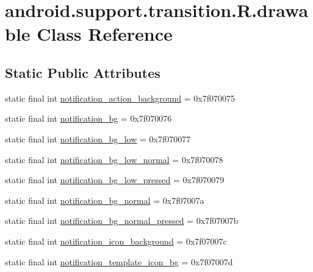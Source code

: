 \hypertarget{classandroid_1_1support_1_1transition_1_1_r_1_1drawable}{}\section{android.\+support.\+transition.\+R.\+drawable Class Reference}
\label{classandroid_1_1support_1_1transition_1_1_r_1_1drawable}
\subsection*{Static Public Attributes}
\begin{DoxyCompactItemize}
\item 
static final int \mbox{\hyperlink{classandroid_1_1support_1_1transition_1_1_r_1_1drawable_aa63a282bba48259acff502a4c32c48dd}{notification\+\_\+action\+\_\+background}} = 0x7f070075
\item 
static final int \mbox{\hyperlink{classandroid_1_1support_1_1transition_1_1_r_1_1drawable_a4e2d76cf7e408949c2b4a0776c7d683e}{notification\+\_\+bg}} = 0x7f070076
\item 
static final int \mbox{\hyperlink{classandroid_1_1support_1_1transition_1_1_r_1_1drawable_a80e92867febdd3ad8ce052e040508e3c}{notification\+\_\+bg\+\_\+low}} = 0x7f070077
\item 
static final int \mbox{\hyperlink{classandroid_1_1support_1_1transition_1_1_r_1_1drawable_a9fa9887b0c07972b38d4759215a9514c}{notification\+\_\+bg\+\_\+low\+\_\+normal}} = 0x7f070078
\item 
static final int \mbox{\hyperlink{classandroid_1_1support_1_1transition_1_1_r_1_1drawable_a5fe6e84c8b7aaf6841d0d37d1fba6dbb}{notification\+\_\+bg\+\_\+low\+\_\+pressed}} = 0x7f070079
\item 
static final int \mbox{\hyperlink{classandroid_1_1support_1_1transition_1_1_r_1_1drawable_a5331c92aadadaaf082aadfe262fcfaf8}{notification\+\_\+bg\+\_\+normal}} = 0x7f07007a
\item 
static final int \mbox{\hyperlink{classandroid_1_1support_1_1transition_1_1_r_1_1drawable_a267ef5dc70197b1688c3a36f7d3a514d}{notification\+\_\+bg\+\_\+normal\+\_\+pressed}} = 0x7f07007b
\item 
static final int \mbox{\hyperlink{classandroid_1_1support_1_1transition_1_1_r_1_1drawable_ab61974a44b1c6b8eafba4027955dac77}{notification\+\_\+icon\+\_\+background}} = 0x7f07007c
\item 
static final int \mbox{\hyperlink{classandroid_1_1support_1_1transition_1_1_r_1_1drawable_a0a2b6625f2aae8b0f520911b4dfe0c42}{notification\+\_\+template\+\_\+icon\+\_\+bg}} = 0x7f07007d

\end{DoxyCompactItemize}
